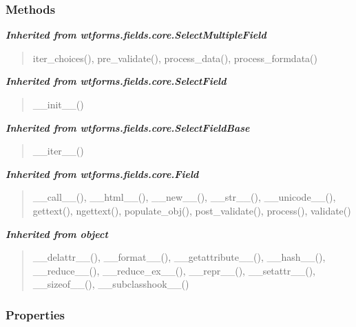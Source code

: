 
  \subsubsection{Methods}


\large{\textbf{\textit{Inherited from wtforms.fields.core.SelectMultipleField}}}

\begin{quote}
iter\_choices(), pre\_validate(), process\_data(), process\_formdata()
\end{quote}

\large{\textbf{\textit{Inherited from wtforms.fields.core.SelectField}}}

\begin{quote}
\_\_init\_\_()
\end{quote}

\large{\textbf{\textit{Inherited from wtforms.fields.core.SelectFieldBase}}}

\begin{quote}
\_\_iter\_\_()
\end{quote}

\large{\textbf{\textit{Inherited from wtforms.fields.core.Field}}}

\begin{quote}
\_\_call\_\_(), \_\_html\_\_(), \_\_new\_\_(), \_\_str\_\_(), \_\_unicode\_\_(), gettext(), ngettext(), populate\_obj(), post\_validate(), process(), validate()
\end{quote}

\large{\textbf{\textit{Inherited from object}}}

\begin{quote}
\_\_delattr\_\_(), \_\_format\_\_(), \_\_getattribute\_\_(), \_\_hash\_\_(), \_\_reduce\_\_(), \_\_reduce\_ex\_\_(), \_\_repr\_\_(), \_\_setattr\_\_(), \_\_sizeof\_\_(), \_\_subclasshook\_\_()
\end{quote}


  \subsubsection{Properties}


